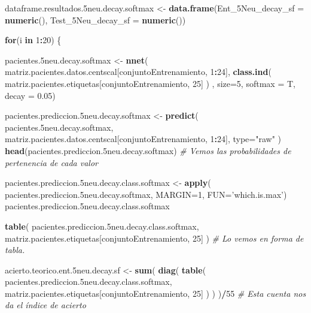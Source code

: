 \documentclass[]{article}
\newenvironment{Shaded}{\begin{snugshade}}{\end{snugshade}}
\newcommand{\KeywordTok}[1]{\textcolor[rgb]{0.13,0.29,0.53}{\textbf{#1}}}
\newcommand{\DataTypeTok}[1]{\textcolor[rgb]{0.13,0.29,0.53}{#1}}
\newcommand{\DecValTok}[1]{\textcolor[rgb]{0.00,0.00,0.81}{#1}}
\newcommand{\FloatTok}[1]{\textcolor[rgb]{0.00,0.00,0.81}{#1}}
\newcommand{\StringTok}[1]{\textcolor[rgb]{0.31,0.60,0.02}{#1}}
\newcommand{\CommentTok}[1]{\textcolor[rgb]{0.56,0.35,0.01}{\textit{#1}}}
\newcommand{\ControlFlowTok}[1]{\textcolor[rgb]{0.13,0.29,0.53}{\textbf{#1}}}
\newcommand{\OperatorTok}[1]{\textcolor[rgb]{0.81,0.36,0.00}{\textbf{#1}}}
\newcommand{\NormalTok}[1]{#1}
\begin{document}
\begin{Shaded}
\begin{Highlighting}[]
\NormalTok{dataframe.resultados.5neu.decay.softmax <-}\StringTok{ }\KeywordTok{data.frame}\NormalTok{(}\DataTypeTok{Ent_5Neu_decay_sf =} \KeywordTok{numeric}\NormalTok{(),}
                                                      \DataTypeTok{Test_5Neu_decay_sf =} \KeywordTok{numeric}\NormalTok{())}

\ControlFlowTok{for}\NormalTok{(i }\ControlFlowTok{in} \DecValTok{1}\OperatorTok{:}\DecValTok{20}\NormalTok{)}
\NormalTok{\{}


\NormalTok{  pacientes.5neu.decay.softmax <-}\StringTok{ }\KeywordTok{nnet}\NormalTok{( matriz.pacientes.datos.centscal[conjuntoEntrenamiento, }\DecValTok{1}\OperatorTok{:}\DecValTok{24}\NormalTok{], }\KeywordTok{class.ind}\NormalTok{( matriz.pacientes.etiquetas[conjuntoEntrenamiento, }\DecValTok{25}\NormalTok{] ) , }\DataTypeTok{size=}\DecValTok{5}\NormalTok{, }\DataTypeTok{softmax =}\NormalTok{ T, }\DataTypeTok{decay =} \FloatTok{0.05}\NormalTok{)}
  
\NormalTok{  pacientes.prediccion.5neu.decay.softmax <-}\StringTok{ }\KeywordTok{predict}\NormalTok{( pacientes.5neu.decay.softmax, matriz.pacientes.datos.centscal[conjuntoEntrenamiento, }\DecValTok{1}\OperatorTok{:}\DecValTok{24}\NormalTok{], }\DataTypeTok{type=}\StringTok{"raw"}\NormalTok{ )}
  \KeywordTok{head}\NormalTok{(pacientes.prediccion.5neu.decay.softmax) }\CommentTok{# Vemos las probabilidades de pertenencia de cada valor}
  
\NormalTok{  pacientes.prediccion.5neu.decay.class.softmax <-}\StringTok{ }\KeywordTok{apply}\NormalTok{( pacientes.prediccion.5neu.decay.softmax, }\DataTypeTok{MARGIN=}\DecValTok{1}\NormalTok{, }\DataTypeTok{FUN=}\StringTok{'which.is.max'}\NormalTok{)}
\NormalTok{  pacientes.prediccion.5neu.decay.class.softmax}
  
  \KeywordTok{table}\NormalTok{( pacientes.prediccion.5neu.decay.class.softmax, matriz.pacientes.etiquetas[conjuntoEntrenamiento, }\DecValTok{25}\NormalTok{] )  }\CommentTok{# Lo vemos en forma de tabla.}
  
\NormalTok{  acierto.teorico.ent.5neu.decay.sf <-}\StringTok{ }\KeywordTok{sum}\NormalTok{( }\KeywordTok{diag}\NormalTok{( }\KeywordTok{table}\NormalTok{( pacientes.prediccion.5neu.decay.class.softmax, matriz.pacientes.etiquetas[conjuntoEntrenamiento, }\DecValTok{25}\NormalTok{] ) ) )}\OperatorTok{/}\DecValTok{55} \CommentTok{# Esta cuenta nos da el índice de acierto}
  

\end{Highlighting}
\end{Shaded}
\end{document}
